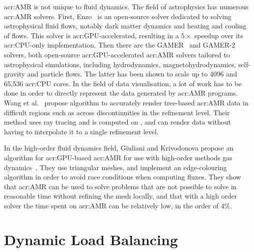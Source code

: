 \Acrlong{acr:AMR} is not unique to fluid dynamics. The field of astrophysics has numerous
\acrshort{acr:AMR} solvers. First, Enzo~\cite{Bryan2014} is an open-source solver dedicated to
solving astrophysical fluid flows, notably dark matter dynamics and heating and cooling of flows.
This solver is \acrshort{acr:GPU}-accelerated, resulting in a \(5 \times \) speedup over its
\acrshort{acr:CPU}-only implementation. Then there are the GAMER~\cite{Schive2010} and
GAMER-2~\cite{Schive2018} solvers, both open-source \acrshort{acr:GPU}-accelerated
\acrshort{acr:AMR} solvers tailored to astrophysical simulations, including hydrodynamics,
magnetohydrodynamics, self-gravity and particle flows. The latter has been shown to scale up to 4096
 and 65,536 \acrshort{acr:CPU} cores. In the field of data visualisation, a lot
of work has to be done in order to directly represent the data generated by \acrshort{acr:AMR}
programs. Wang et al.~\cite{Wang2020} propose algorithm to accurately render tree-based
\acrshort{acr:AMR} data in difficult regions such as across discontinuities in the refinement level.
Their method uses ray tracing and is computed on , and can render data without
having to interpolate it to a single refinement level.

In the high-order fluid dynamics field, Giuliani and Krivodonova propose an algorithm for
\acrshort{acr:GPU}-based \acrlong{acr:AMR} for use with high-order methods gas
dynamics~\cite{Giuliani2019}. They use triangular meshes, and implement an edge-colouring algorithm
in order to avoid race conditions when computing fluxes. They show that \acrshort{acr:AMR} can be
used to solve problems that are not possible to solve in reasonable time without refining the mesh
locally, and that with a high order solver the time spent on \acrshort{acr:AMR} can be relatively
low, in the order of 4\%.

\section{Dynamic Load Balancing}\label{section:literature_review:load_balancing}


~\cite{Karypis1997} %
~\cite{Karypis1997P} %

~\cite{MacNeice2000} %
~\cite{Peplinski2016} %
~\cite{Schive2018} %